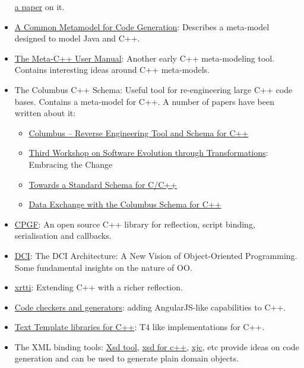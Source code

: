 \documentclass{book}
\begin{document}
\begin{itemize}
  \href{http://apps.nabbel.es/dsdm2010/download_files/dsdm2010_senac.pdf}{a
    paper} on it.
\item
  \href{http://www2.informatik.hu-berlin.de/~piefel/Documents/06CITSA-CMMCG.pdf}{A
    Common Metamodel for Code Generation}: Describes a meta-model
  designed to model Java and C++.
\item
  \href{http://marofra.com/oldhomepage/MetaCPlusPlusDoc/metacplusplus-1.html}{The
    Meta-C++ User Manual}: Another early C++ meta-modeling
  tool. Contains interesting ideas around C++ meta-models.
\item The Columbus C++ Schema: Useful tool for re-engineering large
  C++ code bases. Contains a meta-model for C++. A number of papers
  have been written about it:
\begin{itemize}
\item
  \href{http://www.inf.u-szeged.hu/~beszedes/research/tech27_ferenc_r.pdf}{Columbus
    – Reverse Engineering Tool and Schema for C++}
\item
  \href{http://journal.ub.tu-berlin.de/eceasst/article/download/10/19}{Third
    Workshop on Software Evolution through Transformations}: Embracing
  the Change
\item
  \href{http://www.inf.u-szeged.hu/~ferenc/research/ferencr_schema.ppt.pdf}{Towards
    a Standard Schema for C/C++}
\item
  \href{http://www.inf.u-szeged.hu/~ferenc/research/ferencr_columbus_schema_cpp.pdf}{Data
    Exchange with the Columbus Schema for C++}
\end{itemize}
\item \href{http://www.cpgf.org/}{CPGF}: An open source C++ library
  for reflection, script binding, serialisation and callbacks.
\item \href{http://www.artima.com/articles/dci_vision.html}{DCI}: The
  DCI Architecture: A New Vision of Object-Oriented Programming. Some
  fundamental insights on the nature of OO.
\item \href{http://www.ischo.com/xrtti/index.html}{xrtti}: Extending
  C++ with a richer reflection.
\item
  \href{http://www.open-std.org/jtc1/sc22/wg21/docs/papers/2014/n3883.html}{Code
    checkers and generators}: adding AngularJS-like capabilities to
  C++.
\item
  \href{http://stackoverflow.com/questions/355650/c-html-template-framework-templatizing-library-html-generator-library}{Text
    Template libraries for C++}: T4 like implementations for C++.
\item The XML binding tools:
  \href{http://msdn.microsoft.com/en-us/library/x6c1kb0s(v\%3Dvs.110).aspx}{Xsd
    tool}, \href{http://www.codesynthesis.com/products/xsd/}{xsd for
    c++}, \href{https://jaxb.java.net/2.2.4/docs/xjc.html}{xjc}, etc
  provide ideas on code generation and can be used to generate plain
  domain objects.
\end{itemize}
\end{document}
